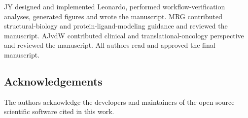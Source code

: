 \documentclass[pdflatex,sn-vancouver-num]{sn-jnl}
\begin{document}
JY designed and implemented Leonardo, performed workflow-verification analyses, generated figures and wrote the manuscript.  MRG contributed structural-biology and protein-ligand-modeling guidance and reviewed the manuscript.  AJvdW contributed clinical and translational-oncology perspective and reviewed the manuscript.  All authors read and approved the final manuscript.

\subsection*{Acknowledgements}

The authors acknowledge the developers and maintainers of the open-source scientific software cited in this work.


\end{document}
